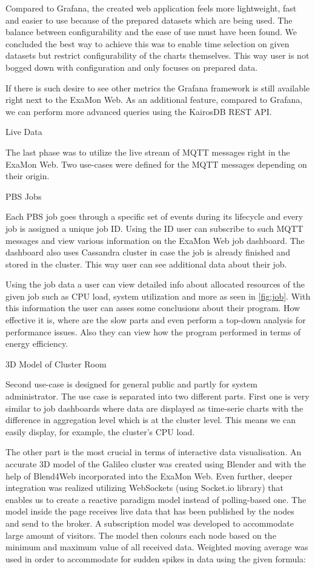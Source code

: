\documentclass[a4paper, twoside]{article}
\newcommand{\highlight}[1]{\textcolor{prace-orange}{#1}}
\newcommand{\itempar}[1]{\noindent\highlight{\textsf #1}\par\noindent}
\begin{document}
\begin{multicols}{3}
Compared to Grafana, the created web application feels more lightweight, fast and easier to use because of the prepared datasets which are being used. The balance between configurability and the ease of use must have been found. We concluded the best way to achieve this was to enable time selection on given datasets but restrict configurability of the charts themselves. This way user is not bogged down with configuration and only focuses on prepared data.

If there is such desire to see other metrics the Grafana framework is still available right next to the ExaMon Web. As an additional feature, compared to Grafana, we can perform more advanced queries using the KairosDB REST API.

\itempar{Live Data}
The last phase was to utilize the live stream of MQTT messages right in the ExaMon Web. Two use-cases were defined for the MQTT messages depending on their origin.

\itempar{PBS Jobs}
Each PBS job goes through a specific set of events during its lifecycle and every job is assigned a unique job ID. Using the ID user can subscribe to such MQTT messages and view various information on the ExaMon Web job dashboard. The dashboard also uses Cassandra cluster in case the job is already finished and stored in the cluster. This way user can see additional data about their job.

Using the job data a user can view detailed info about allocated resources of the given job such as CPU load, system utilization and more as seen in \ref{fig:job}. With this information the user can asses some conclusions about their program. How effective it is, where are the slow parts and even perform a top-down analysis for performance issues. Also they can view how the program performed in terms of energy efficiency.

\itempar{3D Model of Cluster Room}
Second use-case is designed for general public and partly for system administrator. The use case is separated into two different parts. First one is very similar to job dashboards where data are displayed as time-serie charts with the difference in aggregation level which is at the cluster level. This means we can easily display, for example, the cluster's CPU load.

The other part is the most crucial in terms of interactive data visualisation. An accurate 3D model of the Galileo cluster was created using Blender and with the help of Blend4Web incorporated into the ExaMon Web. Even further, deeper integration was realized utilizing WebSockets (using Socket.io library) that enables us to create a reactive paradigm model instead of polling-based one. The model inside the page receives live data that has been published by the nodes and send to the broker. A subscription model was developed to accommodate large amount of visitors. The model then colours each node based on the minimum and maximum value of all received data. Weighted moving average was used in order to accommodate for sudden spikes in data using the given formula:


\end{multicols}
\end{document}
